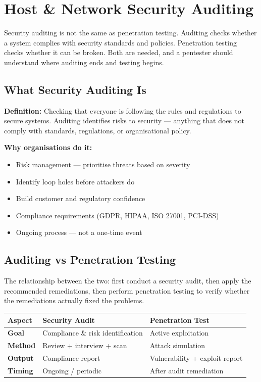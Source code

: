 \chapter{Host \& Network Security Auditing}
\label{ch:auditing}

Security auditing is not the same as penetration testing. Auditing checks whether
a system complies with security standards and policies. Penetration testing checks
whether it can be broken. Both are needed, and a pentester should understand where
auditing ends and testing begins.

\section{What Security Auditing Is}
\label{sec:what_auditing}

\textbf{Definition:} Checking that everyone is following the rules and regulations
to secure systems. Auditing identifies risks to security --- anything that does not
comply with standards, regulations, or organisational policy.

\textbf{Why organisations do it:}
\begin{itemize}
  \item Risk management --- prioritise threats based on severity
  \item Identify loop holes before attackers do
  \item Build customer and regulatory confidence
  \item Compliance requirements (GDPR, HIPAA, ISO 27001, PCI-DSS)
  \item Ongoing process --- not a one-time event
\end{itemize}

\section{Auditing vs Penetration Testing}
\label{sec:audit_vs_pentest}

\begin{notebox}
The relationship between the two: first conduct a security audit, then apply
the recommended remediations, then perform penetration testing to verify whether
the remediations actually fixed the problems.
\end{notebox}

\begin{longtable}{p{4cm} p{4cm} p{4cm}}
  \toprule
  \textbf{Aspect} & \textbf{Security Audit} & \textbf{Penetration Test} \\
  \midrule
  \textbf{Goal} & Compliance \& risk identification & Active exploitation \\
  \textbf{Method} & Review + interview + scan & Attack simulation \\
  \textbf{Output} & Compliance report & Vulnerability + exploit report \\
  \textbf{Timing} & Ongoing / periodic & After audit remediation \\
  \bottomrule
\end{longtable}

